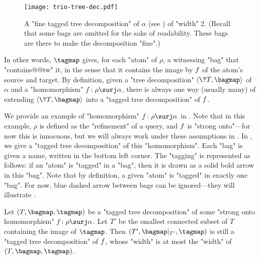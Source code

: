\begin{figure}[tbp]
	\centering
	\texttt{[image: trio-tree-dec.pdf]}
	\caption{
		\AP\label{fig:trio-tree-dec}
		A "fine tagged tree decomposition" of $\alpha$ (see ) of "width" 2.
		(Recall that some bags are omitted for the sake of readability. These bags
		are there to make the decomposition "fine".)
	}
\end{figure}

In other words, $\tagmap$ gives,
for each "atom" of $\rho$, a witnessing "bag" that "contains@@tw" it, in the sense that
it contains the image by $f$ of the atom's source and target.
By definition, given a "tree decomposition" $\tup{\?T, \bagmap}$ of $\alpha$ and a "homomorphism"
$\fun\colon \rho \surj \alpha$, there is always one way (usually many) of extending $\tup{\?T, \bagmap}$
into a "tagged tree decomposition" of $f$.

We provide an example of "homomorphism" $\fun\colon \rho \surj \alpha$ in . Note 
that in this example, $\rho$ is defined as the "refinement" of a query, and $f$ is "strong 
onto"---for now this is innocuous, but we will always work under these
assumptions in . In , we give a "tagged tree 
decomposition" of this "homomorphism". Each "bag" is given a name, written in the bottom left 
corner. The "tagging" is represented as follows: if an "atom" is "tagged" in a "bag", then it
is drawn as a solid bold arrow in this "bag". Note that by definition, a given "atom" is "tagged" in
exactly one "bag". For now, blue dashed arrow between bags can be ignored---they will illustrate .

\begin{fact}
    \AP\label{fact:restriction_tagged_treedec}
    Let $(T, \bagmap, \tagmap)$ be a "tagged tree decomposition" of some "strong onto homomorphism"
    $\fun\colon \rho \surj \alpha$.
    Let $T'$ be the smallest connected subset of $T$ containing the image of $\tagmap$.
    Then $(T', \bagmap\vert_{T'}, \tagmap)$ is still a "tagged tree decomposition" of $f$,
    whose "width" is at most the "width" of $(T, \bagmap, \tagmap)$.
\end{fact}


